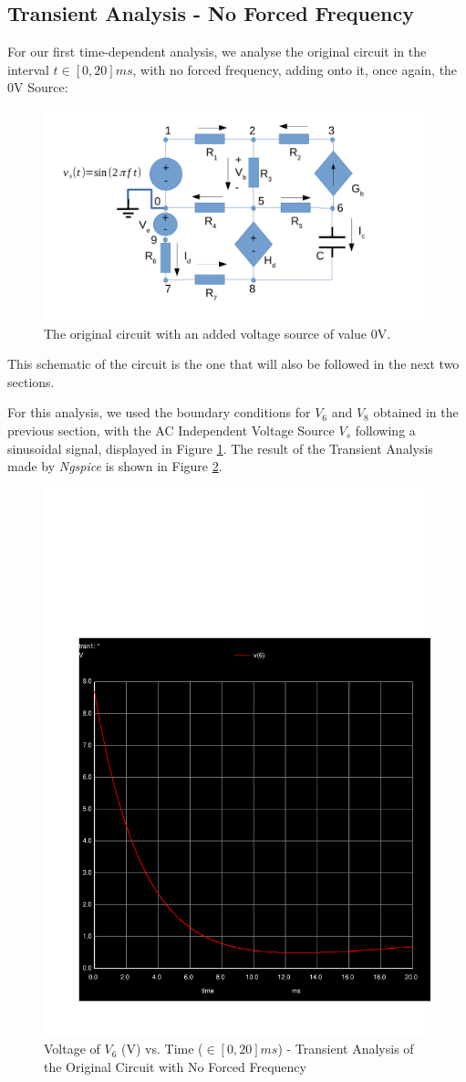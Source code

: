 \clearpage

\subsection{Transient Analysis - No Forced Frequency}

For our first time-dependent analysis, we analyse the original circuit in the interval $t \in [0, 20]ms$, with no forced frequency, adding onto it, once again, the 0V Source:

 

\begin{figure}[h] \centering
\includegraphics[width=0.5\linewidth]{t2-sim345.pdf}
\caption{The original circuit with an added voltage source of value 0V.}
\label{fig:sim345}
\end{figure}

This schematic of the circuit is the one that will also be followed in the next two sections.

For this analysis, we used the boundary conditions for $V_6$ and $V_8$ obtained in the previous section, with the AC Independent Voltage Source $V_s$ following a sinusoidal signal, displayed in Figure \ref{fig:sim345}. The result of the Transient Analysis made by \textit{Ngspice} is shown in Figure \ref{fig:sim-graph3}.

 

\begin{figure}[h] \centering
\includegraphics[width=0.4\linewidth]{../sim/trans3.pdf}
\caption{Voltage of $V_6$ (V) vs. Time ($\in [0, 20]ms$) - Transient Analysis of the Original Circuit with No Forced Frequency}
\label{fig:sim-graph3}
\end{figure}

